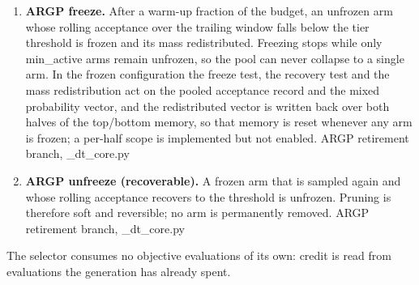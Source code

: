 \documentclass[algorithms,article,submit,moreauthors,pdftex]{Definitions/mdpi}
\begin{document}
\begin{enumerate}
  $\{\pi_m\ge\pi_{\min}=0.05,\ \sum_m \pi_m = 1\}$, not a floor followed by
  renormalization. \hfill\_ace\_project\_probs, \_dt\_core.py
\item \textbf{ARGP freeze.} After a warm-up fraction of the budget, an unfrozen
  arm whose rolling acceptance over the trailing window falls below the tier
  threshold is frozen and its mass redistributed. Freezing stops while only
  min\_active arms remain unfrozen, so the pool can never collapse to a
  single arm. In the frozen configuration the freeze test, the recovery test
  and the mass redistribution act on the pooled acceptance record and the
  mixed probability vector, and the redistributed vector is written back over
  both halves of the top/bottom memory, so that memory is reset whenever any
  arm is frozen; a per-half scope is implemented but not enabled.
  \hfill ARGP retirement branch, \_dt\_core.py
\item \textbf{ARGP unfreeze (recoverable).} A frozen arm that is sampled again
  and whose rolling acceptance recovers to the threshold is unfrozen. Pruning is
  therefore soft and reversible; no arm is permanently removed.
  \hfill ARGP retirement branch, \_dt\_core.py
\end{enumerate}

\noindent The selector consumes no objective evaluations of its own: credit is
read from evaluations the generation has already spent.
\end{document}
